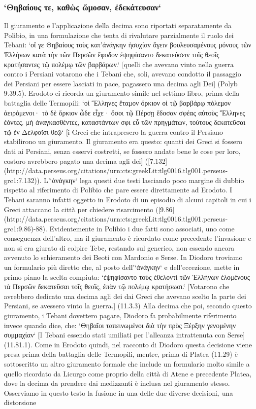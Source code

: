 
    \subsubsection{`Θηβαίους τε, καθὼς ὤμοσαν, ἐδεκάτευσαν`}
    Il giuramento e l'applicazione della decima sono riportati separatamente da Polibio, in una formulazione che tenta di rivalutare parzialmente il ruolo dei Tebani: `οἵ γε Θηβαίους τοὺς κατ’ἀνάγκην ἡσυχίαν ἄγειν βουλευσαμένους μόνους τῶν Ἑλλήνων κατὰ τὴν τῶν Περσῶν ἔφοδον ἐψηφίσαντο δεκατεύσειν τοῖς θεοῖς κρατήσαντες τῷ πολέμῳ τῶν βαρβάρων.` [quelli che avevano vinto nella guerra contro i Persiani votarono che i Tebani che, soli, avevano condotto il passaggio dei Persiani per essere lasciati in pace, pagassero una decima agli Dei] (Polyb 9.39.5). Erodoto ci ricorda un giuramento simile nel settimo libro, prima della battaglia delle Termopili: `οἱ Ἕλληνες ἔταμον ὅρκιον οἱ τῷ βαρβάρῳ πόλεμον ἀειρόμενοι· τὸ δὲ ὅρκιον ὧδε εἶχε· ὅσοι τῷ Πέρσῃ ἔδοσαν σφέας αὐτοὺς Ἕλληνες ἐόντες, μὴ ἀναγκασθέντες, καταστάντων σφι εὖ τῶν πρηγμάτων, τούτους δεκατεῦσαι τῷ ἐν Δελφοῖσι θεῷ` [i Greci che intrapresero la guerra contro il Persiano stabilirono un giuramento. Il giuramento era questo: quanti dei Greci si fossero dati ai Persiani, senza esservi costretti, se fossero andate bene le cose per loro, costoro avrebbero pagato una decima agli dei] ([7.132](http://data.perseus.org/citations/urn:cts:greekLit:tlg0016.tlg001.perseus-grc1:7.132)). L'`ἀνάγκην` lega questi due testi lasciando poco margine di dubbio rispetto al riferimento di Polibio  che pare essere direttamente ad Erodoto. I Tebani saranno infatti oggetto in Erodoto di un episodio di alcuni capitoli in cui i Greci attaccano la città per chiedere risarcimento ([9.86](http://data.perseus.org/citations/urn:cts:greekLit:tlg0016.tlg001.perseus-grc1:9.86)-88).  Evidentemente in Polibio i due fatti sono associati, uno come conseguenza dell'altro, ma il giuramento è ricordato come precedente l'invasione e non si era giurato di colpire Tebe, restando sul generico, non essendo ancora avvenuto lo schieramento dei Beoti con Mardonio e Serse. In  Diodoro troviamo un formulario più diretto che, al posto dell'`ἀνάγκην` e dell'eccezione, mette in primo piano la scelta compiuta: `ἐψηφίσαντο τοὺς ἐθελοντὶ τῶν Ἑλλήνων ἑλομένους τὰ Περσῶν δεκατεῦσαι τοῖς θεοῖς, ἐπὰν τῷ πολέμῳ κρατήσωσι.` [Votarono che avrebbero dedicato una decima agli dei dai Greci che avevano scelto la parte dei Persiani, se avessero vinto la guerra.] (11.3.3) Alla decima che poi, secondo questo giuramento, i Tebani dovettero pagare,  Diodoro fa probabilmente riferimento invece quando dice, che: `Θηβαῖοι ταπεινωμένοι διὰ τὴν πρὸς Ξέρξην γενομένην συμμαχίαν` [I Tebani essendo stati umiliati per l'alleanza intrattenuta con Serse] (11.81.1). Come in Erodoto quindi, nel racconto di  Diodoro questa decisione viene presa prima della battaglia delle Termopili, mentre, prima di Platea (11.29) è sottoscritto un altro giuramento formale che include un formulario molto simile a quello ricordato da Licurgo  come proprio della città di Atene e  precedente Platea, dove la decima da prendere dai medizzanti è inclusa nel giuramento stesso. Osserviamo in questo testo la fusione in una delle due diverse decisioni, una distorsione 